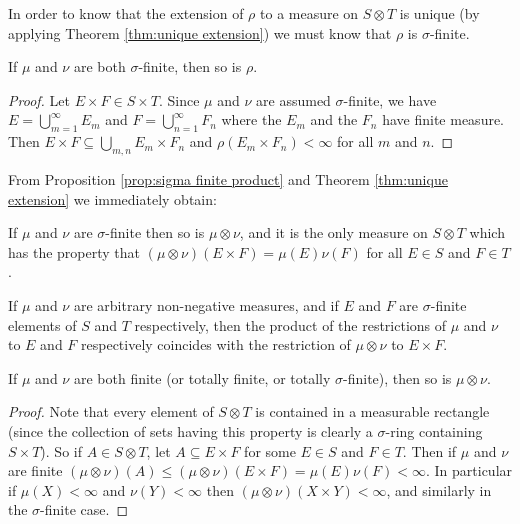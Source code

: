 In order to know that the extension of $\rho$ to a measure on $S\otimes T$ is unique (by applying Theorem \ref{thm:unique extension}) we must know that $\rho$ is $\sigma$-finite.

\begin{proposition}\label{prop:sigma finite product}
If $\mu$ and $\nu$ are both $\sigma$-finite, then so is $\rho$.
\end{proposition}

\begin{proof}
Let $E\times F\in S\times T$. Since $\mu$ and $\nu$ are assumed $\sigma$-finite, we have $E=\bigcup_{m=1}^\infty E_m$ and $F=\bigcup_{n=1}^\infty F_n$ where the $E_m$ and the $F_n$ have finite measure. Then $E\times F\subseteq\bigcup_{m,n}E_m\times F_n$ and $\rho(E_m\times F_n)<\infty$ for all $m$ and $n$.
\end{proof}

From Proposition \ref{prop:sigma finite product} and Theorem \ref{thm:unique extension} we immediately obtain:

\begin{proposition}
If $\mu$ and $\nu$ are $\sigma$-finite then so is $\mu\otimes\nu$, and it is the only measure on $S\otimes T$ which has the property that $(\mu\otimes\nu)(E\times F)=\mu(E)\nu(F)$ for all $E\in S$ and $F\in T$.
\end{proposition}

\begin{corollary}
If $\mu$ and $\nu$ are arbitrary non-negative measures, and if $E$ and $F$ are $\sigma$-finite elements of $S$ and $T$ respectively, then the product of the restrictions of $\mu$ and $\nu$ to $E$ and $F$ respectively coincides with the restriction of $\mu\otimes\nu$ to $E\times F$.
\end{corollary} 

\begin{proposition}\label{prop:totally finite product}
If $\mu$ and $\nu$ are both finite (or totally finite, or totally $\sigma$-finite), then so is $\mu\otimes\nu$.
\end{proposition}

\begin{proof}
Note that every element of $S\otimes T$ is contained in a measurable rectangle (since the collection of sets having this property is clearly a $\sigma$-ring containing $S\times T$). So if $A\in S\otimes T$, let $A\subseteq E\times F$ for some $E\in S$ and $F\in T$. Then if $\mu$ and $\nu$ are finite $(\mu\otimes\nu)(A)\leq(\mu\otimes\nu)(E\times F)=\mu(E)\nu(F)<\infty$. In particular if $\mu(X)<\infty$ and $\nu(Y)<\infty$ then $(\mu\otimes\nu)(X\times Y)<\infty$, and similarly in the $\sigma$-finite case.
\end{proof}

